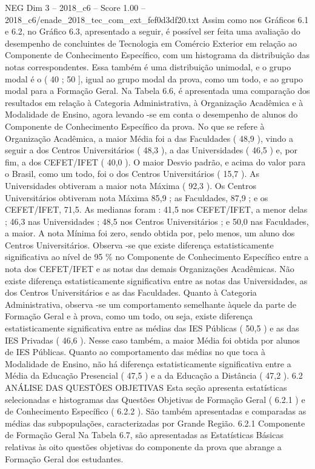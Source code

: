 \begin{textsample}{NEG Dim 3 – 2018\_c6 – Score 1.00 – 2018\_c6/enade\_2018\_tec\_com\_ext\_fef0d3df20.txt}
Assim como nos Gráficos 6.1 e 6.2, no Gráfico 6.3, apresentado a seguir, é possível ser feita uma avaliação do desempenho de concluintes de Tecnologia em Comércio Exterior em relação ao Componente de Conhecimento Específico, com um histograma da distribuição das notas correspondentes.
Essa também é uma distribuição unimodal, e o grupo modal é o ( 40 ; 50 ], igual ao grupo modal da prova, como um todo, e ao grupo modal para a Formação Geral.
Na Tabela 6.6, é apresentada uma comparação dos resultados em relação à Categoria Administrativa, à Organização Acadêmica e à Modalidade de Ensino, agora levando -se em conta o desempenho de alunos do Componente de Conhecimento Específico da prova.
No que se refere à Organização Acadêmica, a maior Média foi a das Faculdades ( 48,9 ), vindo a seguir a dos Centros Universitários ( 48,3 ), a das Universidades ( 46,5 ) e, por fim, a dos CEFET/IFET ( 40,0 ).
O maior Desvio padrão, e acima do valor para o Brasil, como um todo, foi o dos Centros Universitários ( 15,7 ).
As Universidades obtiveram a maior nota Máxima ( 92,3 ).
Os Centros Universitários obtiveram nota Máxima 85,9 ; as Faculdades, 87,9 ; e os CEFET/IFET, 71,5.
As medianas foram : 41,5 nos CEFET/IFET, a menor delas ; 46,3 nas Universidades ; 48,5 nos Centros Universitários ; e 50,0 nas Faculdades, a maior.
A nota Mínima foi zero, sendo obtida por, pelo menos, um aluno dos Centros Universitários.
Observa -se que existe diferença estatisticamente significativa ao nível de 95 \% no Componente de Conhecimento Específico entre a nota dos CEFET/IFET e as notas das demais Organizações Acadêmicas.
Não existe diferença estatisticamente significativa entre as notas das Universidades, as dos Centros Universitários e as das Faculdades.
Quanto à Categoria Administrativa, observa -se um comportamento semelhante àquele da parte de Formação Geral e à prova, como um todo, ou seja, existe diferença estatisticamente significativa entre as médias das IES Públicas ( 50,5 ) e as das IES Privadas ( 46,6 ).
Nesse caso também, a maior Média foi obtida por alunos de IES Públicas.
Quanto ao comportamento das médias no que toca à Modalidade de Ensino, não há diferença estatisticamente significativa entre a Média da Educação Presencial ( 47,5 ) e a da Educação a Distância ( 47,2 ). 6.2 ANÁLISE DAS QUESTÕES OBJETIVAS Esta seção apresenta estatísticas selecionadas e histogramas das Questões Objetivas de Formação Geral ( 6.2.1 ) e de Conhecimento Específico ( 6.2.2 ).
São também apresentadas e comparadas as médias das subpopulações, caracterizadas por Grande Região. 6.2.1 Componente de Formação Geral Na Tabela 6.7, são apresentadas as Estatísticas Básicas relativas às oito questões objetivas do componente da prova que abrange a Formação Geral dos estudantes.

\end{textsample}
